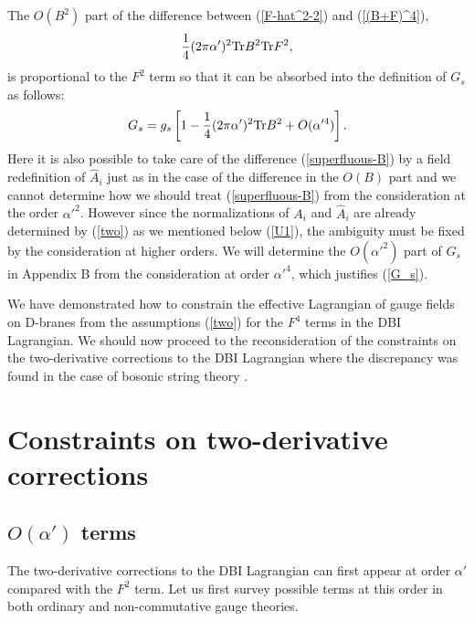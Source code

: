 \documentclass[a4paper,12pt]{article}
\begin{document}
The $O(B^2)$ part of the difference
between (\ref{F-hat^2-2}) and (\ref{(B+F)^4}),
\begin{equation}
\frac{1}{4} (2 \pi \alpha')^2 {\rm Tr} B^2 {\rm Tr} F^2,
\label{superfluous-B}
\end{equation}
is proportional to the $F^2$ term so that
it can be absorbed into the definition of $G_s$ as follows:
\begin{equation}
G_s
= g_s \left[
1 -\frac{1}{4} (2 \pi \alpha')^2
{\rm Tr} B^2 + O(\alpha'^4)
\right].
\label{G_s}
\end{equation}
Here it is also possible to take care of the difference
(\ref{superfluous-B}) by a field redefinition of $\hat{A}_i$
just as in the case of the difference in the $O(B)$ part
and we cannot determine how we should treat
(\ref{superfluous-B}) from the consideration
at the order $\alpha'^2$.
However since the normalizations of $A_i$ and $\hat{A}_i$
are already determined by (\ref{two}) as we mentioned
below (\ref{U1}), the ambiguity must be fixed
by the consideration at higher orders.
We will determine the $O(\alpha'^2)$ part of $G_s$
in Appendix B from the consideration at order $\alpha'^4$,
which justifies (\ref{G_s}).

We have demonstrated how to constrain the effective Lagrangian
of gauge fields on D-branes from the assumptions (\ref{two})
for the $F^4$ terms in the DBI Lagrangian.
We should now proceed to the reconsideration
of the constraints on the two-derivative
corrections to the DBI Lagrangian
where the discrepancy was found
in the case of bosonic string theory \cite{Okawa}.

\section{Constraints on two-derivative corrections}
\setcounter{equation}{0}

\subsection{$O(\alpha')$ terms}
\indent

The two-derivative corrections to the DBI Lagrangian
can first appear at order $\alpha'$
compared with the $F^2$ term.
Let us first survey possible terms at this order
in both ordinary and non-commutative gauge theories.
\end{document}
